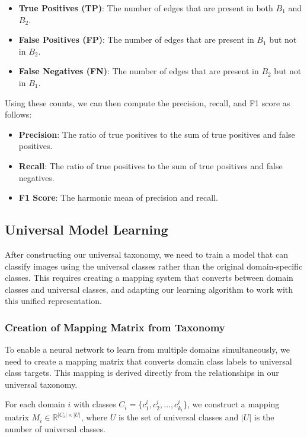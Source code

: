 \begin{itemize}
      \item \textbf{True Positives (TP)}: The number of edges that are present in both $B_1$ and $B_2$.
      \item \textbf{False Positives (FP)}: The number of edges that are present in $B_1$ but not in $B_2$.
      \item \textbf{False Negatives (FN)}: The number of edges that are present in $B_2$ but not in $B_1$.
\end{itemize}

Using these counts, we can then compute the precision, recall, and F1 score as follows:

\begin{itemize}
      \item \textbf{Precision}: The ratio of true positives to the sum of true positives and false positives.
      \item \textbf{Recall}: The ratio of true positives to the sum of true positives and false negatives.
      \item \textbf{F1 Score}: The harmonic mean of precision and recall.
\end{itemize}


\subsection{Universal Model Learning} \label{sec:universal_model_learning}

After constructing our universal taxonomy, we need to train a model that can classify images
using the universal classes rather than the original domain-specific classes.
This requires creating a mapping system that converts between domain classes and universal classes,
and adapting our learning algorithm to work with this unified representation.

\subsubsection{Creation of Mapping Matrix from Taxonomy}

To enable a neural network to learn from multiple domains simultaneously,
we need to create a mapping matrix that converts domain class labels to universal class targets.
This mapping is derived directly from the relationships in our universal taxonomy.

For each domain $i$ with classes $C_i = \{c_1^i, c_2^i, \ldots, c_{k_i}^i\}$,
we construct a mapping matrix $M_i \in \mathbb{R}^{|C_i| \times |U|}$,
where $U$ is the set of universal classes and $|U|$ is the number of universal classes.

